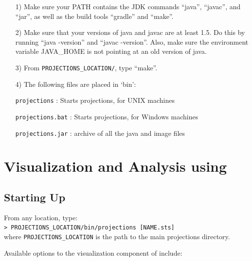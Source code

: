 \documentclass[10pt]{report}
\begin{document}
\begin{enumerate}
\item[1)]
   Make sure your PATH contains the JDK commands ``java'', ``javac'',  and ``jar'',
   as well as the build tools ``gradle'' and ``make''.
\item[2)]
   Make sure that your versions of java and javac are at least 1.5. Do this by running ``java -version'' and ``javac -version''. Also, make sure the environment variable JAVA\_HOME is not pointing at an old version of java.
\item[3)]
   From {\tt PROJECTIONS\_LOCATION/}, type ``make''.
\item[4)]
   The following files are placed in `bin':

      {\tt projections}           : Starts projections, for UNIX machines

      {\tt projections.bat}       : Starts projections, for Windows machines

      {\tt projections.jar}       : archive of all the java and image files
\end{enumerate}

\section{Visualization and Analysis using \projections{}}

\subsection{Starting Up}
\label{sec:startingUp}
From any location, type: \\
{\tt > PROJECTIONS\_LOCATION/bin/projections [NAME.sts]} \\
where {\tt PROJECTIONS\_LOCATION} is the path to the main projections
directory.

Available options to the visualization component of \projections{} include:
\end{document}
